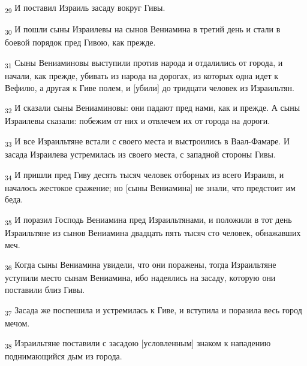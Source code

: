 \begin{tcolorbox}
\textsubscript{29} И поставил Израиль засаду вокруг Гивы.
\end{tcolorbox}
\begin{tcolorbox}
\textsubscript{30} И пошли сыны Израилевы на сынов Вениамина в третий день и стали в боевой порядок пред Гивою, как прежде.
\end{tcolorbox}
\begin{tcolorbox}
\textsubscript{31} Сыны Вениаминовы выступили против народа и отдалились от города, и начали, как прежде, убивать из народа на дорогах, из которых одна идет к Вефилю, а другая к Гиве полем, и [убили] до тридцати человек из Израильтян.
\end{tcolorbox}
\begin{tcolorbox}
\textsubscript{32} И сказали сыны Вениаминовы: они падают пред нами, как и прежде. А сыны Израилевы сказали: побежим от них и отвлечем их от города на дороги.
\end{tcolorbox}
\begin{tcolorbox}
\textsubscript{33} И все Израильтяне встали с своего места и выстроились в Ваал-Фамаре. И засада Израилева устремилась из своего места, с западной стороны Гивы.
\end{tcolorbox}
\begin{tcolorbox}
\textsubscript{34} И пришли пред Гиву десять тысяч человек отборных из всего Израиля, и началось жестокое сражение; но [сыны Вениамина] не знали, что предстоит им беда.
\end{tcolorbox}
\begin{tcolorbox}
\textsubscript{35} И поразил Господь Вениамина пред Израильтянами, и положили в тот день Израильтяне из сынов Вениамина двадцать пять тысяч сто человек, обнажавших меч.
\end{tcolorbox}
\begin{tcolorbox}
\textsubscript{36} Когда сыны Вениамина увидели, что они поражены, тогда Израильтяне уступили место сынам Вениамина, ибо надеялись на засаду, которую они поставили близ Гивы.
\end{tcolorbox}
\begin{tcolorbox}
\textsubscript{37} Засада же поспешила и устремилась к Гиве, и вступила и поразила весь город мечом.
\end{tcolorbox}
\begin{tcolorbox}
\textsubscript{38} Израильтяне поставили с засадою [условленным] знаком к нападению поднимающийся дым из города.
\end{tcolorbox}
